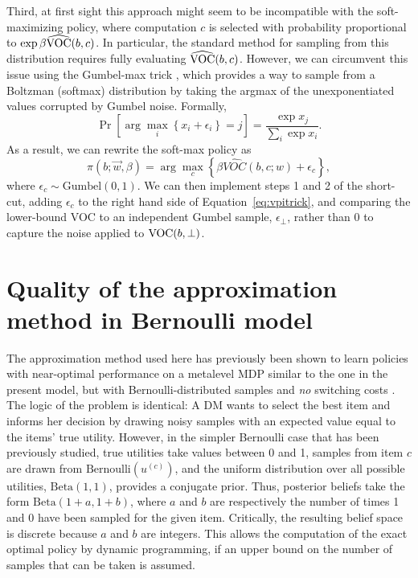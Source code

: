 Third, at first sight this approach might seem to be incompatible with the soft-maximizing policy, where computation $c$ is selected with probability proportional to $\exp\beta\widehat{\text{VOC}}(b,c)$. In particular, the standard method for sampling from this distribution requires fully evaluating $\widehat{\text{VOC}}(b,c)$. However, we can circumvent this issue using the Gumbel-max trick \citep{yellott1977relationship}, which provides a way to sample from a Boltzman (softmax) distribution by taking the argmax of the unexponentiated values corrupted by Gumbel noise. Formally,
%
\begin{equation*}
  \Pr\left[\arg\max_{i}\left\{ x_{i}+\epsilon_{i}\right\} =j\right]=\frac{\exp x_{j}}{\sum_{i}\exp x_{i}}.
\end{equation*}
%
As a result, we can rewrite the soft-max policy as 
%
\begin{equation*}
  \pi(b;\vec{w},\beta)=\arg\max_{c}\left\{ \beta\widehat{VOC}(b,c;w)+\epsilon_{c}\right\} ,
\end{equation*}
%
where $\epsilon_{c}\sim\text{Gumbel}(0,1)$. We can then implement steps 1 and 2 of the short-cut, adding $\epsilon_{c}$ to the right hand side of Equation~\ref{eq:vpitrick}, and comparing the lower-bound VOC to an independent Gumbel sample, $\epsilon_\bot$, rather than 0 to capture the noise applied to $\text{VOC}(b,\bot)$.



\section{Quality of the approximation method in Bernoulli model}\label{app:attention-bernoulli}

The approximation method used here has previously been shown to learn policies with near-optimal performance on a metalevel MDP similar to the one in the present model, but with Bernoulli-distributed samples and \emph{no} switching costs \citep{callaway2018learning}. The logic of the problem is identical: A DM wants to select the best item and informs her decision by drawing noisy samples with an expected value  equal to the items' true utility. However, in the simpler Bernoulli case that has been previously studied, true utilities take values between 0 and 1, samples from item $c$ are drawn from $\text{Bernoulli}(u^{(c)})$,  and the  uniform distribution over all possible utilities, $\text{Beta}(1, 1)$, provides a conjugate prior. Thus, posterior beliefs take the form $\text{Beta}(1+a, 1+b)$, where $a$ and $b$ are respectively the number of times 1 and 0 have been sampled for the given item.  Critically, the resulting belief space is discrete because $a$ and $b$ are integers. This allows the computation of the exact optimal policy by dynamic programming, if an upper bound on the number of samples that can be taken is assumed. 

